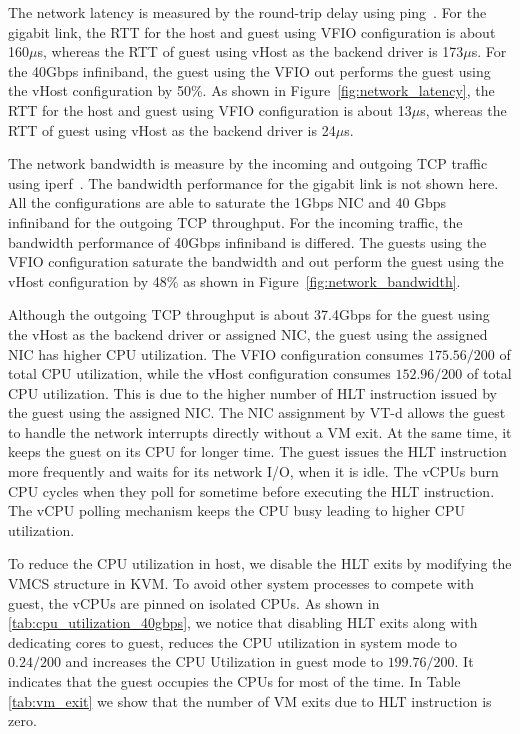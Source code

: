 The network latency is measured by the round-trip delay using
ping~\cite{ping}. For the gigabit link, the RTT for the host
and guest using VFIO configuration is about 160$\mu$s, whereas
the RTT of guest using vHost as the backend driver is
173$\mu$s. For the 40Gbps infiniband, the guest using the VFIO
out performs the guest using the vHost configuration by 50\%.
As shown in Figure~\ref{fig:network_latency}, the RTT for the
host and guest using VFIO configuration is about 13$\mu$s,
whereas the RTT of guest using vHost as the backend driver is
24$\mu$s.

The network bandwidth is measure by the incoming and outgoing
TCP traffic using iperf~\cite{iperf}. The bandwidth
performance for the gigabit link is not shown here. All the
configurations are able to saturate the 1Gbps NIC and 40 Gbps
infiniband for the outgoing TCP throughput. For the incoming
traffic, the bandwidth performance of 40Gbps infiniband is
differed. The guests using the VFIO configuration saturate the
bandwidth and out perform the guest using the vHost
configuration by 48\% as shown in
Figure~\ref{fig:network_bandwidth}.

Although the outgoing TCP throughput is about 37.4Gbps for the
guest using the vHost as the backend driver or assigned NIC,
the guest using the assigned NIC has higher CPU utilization.
The VFIO configuration consumes $175.56/200$ of total CPU
utilization, while the vHost configuration consumes
$152.96/200$ of total CPU utilization. This is due to the
higher number of HLT instruction issued by the guest using the
assigned NIC. The NIC assignment by VT-d allows the guest to
handle the network interrupts directly without a VM exit. At
the same time, it keeps the guest on its CPU for longer time.
The guest issues the HLT instruction more frequently and waits
for its network I/O, when it is idle. The vCPUs burn CPU
cycles when they poll for sometime before executing the HLT
instruction. The vCPU polling mechanism keeps the CPU busy
leading to higher CPU utilization.

To reduce the CPU utilization in host, we disable the HLT
exits by modifying the VMCS structure in KVM. To avoid other
system processes to compete with guest, the vCPUs are pinned
on isolated CPUs. As shown in
\ref{tab:cpu_utilization_40gbps}, we notice that disabling HLT
exits along with dedicating cores to guest, reduces the CPU
utilization in system mode to $0.24/200$ and increases the CPU
Utilization in guest mode to $199.76/200$. It indicates that
the guest occupies the CPUs for most of the time. In Table
\ref{tab:vm_exit} we show that the number of VM exits due to
HLT instruction is zero.
